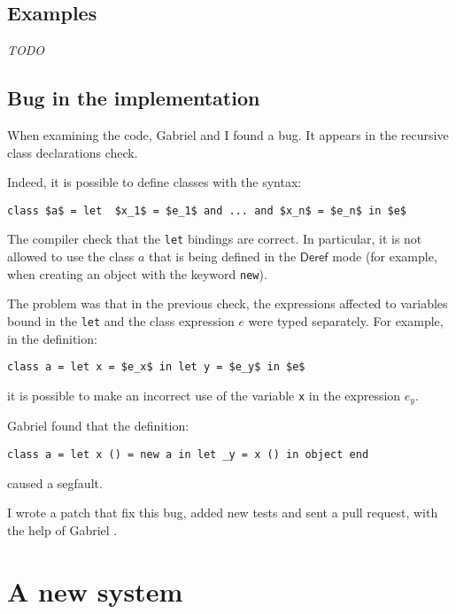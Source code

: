 \documentclass{article}
\newcommand{\Deref}{\mathsf{Deref}}
\begin{document}

\subsection{Examples}
\textit{TODO}

\subsection{Bug in the implementation}
When examining the code, Gabriel and I found a bug. It appears in the recursive
class declarations check.

Indeed, it is possible to define classes with the syntax:
\begin{lstlisting}[mathescape=true]
class $a$ = let  $x_1$ = $e_1$ and ... and $x_n$ = $e_n$ in $e$
\end{lstlisting}
The compiler check that the \lstinline|let| bindings are correct. In
particular, it is not allowed to use the class $a$ that is being defined in the
$\Deref$ mode (for example, when creating an object with the keyword
\lstinline|new|).

The problem was that in the previous check, the expressions affected to
variables bound in the \lstinline|let| and the class expression $e$ were
typed separately. For example, in the definition:
\begin{lstlisting}[mathescape=true]
class a = let x = $e_x$ in let y = $e_y$ in $e$
\end{lstlisting}
it is possible to make an incorrect use of the variable \lstinline|x| in the
expression $e_y$.

Gabriel found that the definition:
\begin{lstlisting}
class a = let x () = new a in let _y = x () in object end
\end{lstlisting}
caused a segfault.

I wrote a patch that fix this bug, added new tests and sent a pull request,
with the help of Gabriel \cite{PullRequest}.


\section{A new system}

\end{document}
